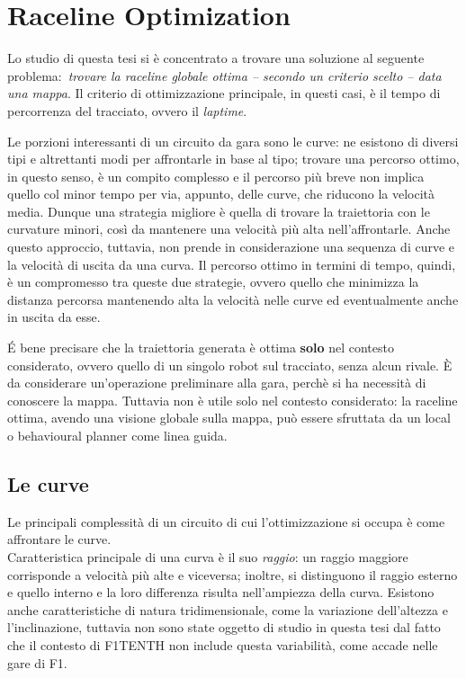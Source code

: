 
\chapter{Raceline Optimization}
\label{chap:opt}

Lo studio di questa tesi si è concentrato a trovare una soluzione al seguente problema:\ \textit{trovare
la raceline globale ottima \emph{\footnotesize -- secondo un criterio scelto --} data una mappa}. Il
criterio di ottimizzazione principale, in questi casi, è il tempo di percorrenza del tracciato, ovvero il
\textit{laptime}.

Le porzioni interessanti di un circuito da gara sono le curve: ne esistono di diversi tipi e altrettanti
modi per affrontarle in base al tipo; trovare una percorso ottimo, in questo senso, è un compito complesso e
il percorso più breve non implica quello col minor tempo per via, appunto, delle curve, che riducono la
velocità media. Dunque una strategia migliore è quella di trovare la traiettoria con le curvature minori,
così da mantenere una velocità più alta nell'affrontarle. Anche questo approccio, tuttavia, non prende in
considerazione una sequenza di curve e la velocità di uscita da una curva. Il percorso ottimo in termini
di tempo, quindi, è un compromesso tra queste due strategie, ovvero quello che minimizza la distanza
percorsa mantenendo alta la velocità nelle curve ed eventualmente anche in uscita da esse.

É bene precisare che la traiettoria generata è ottima \textbf{solo} nel contesto considerato, ovvero
quello di un singolo robot sul tracciato, senza alcun rivale. È da considerare un'operazione preliminare
alla gara, perchè si ha necessità di conoscere la mappa.
Tuttavia non è utile solo nel contesto considerato: la raceline ottima, avendo una visione globale sulla
mappa, può essere sfruttata da un local o behavioural planner come linea guida.

\section{Le curve}
Le principali complessità di un circuito di cui l'ottimizzazione si occupa è come affrontare le curve.\\
Caratteristica principale di una curva è il suo \textit{raggio}: un raggio maggiore corrisponde a
velocità più alte e viceversa; inoltre, si distinguono il raggio esterno e quello interno e la loro
differenza risulta nell'ampiezza della curva.
Esistono anche caratteristiche di natura tridimensionale, come la variazione dell'altezza e
l'inclinazione, tuttavia non sono state oggetto di studio in questa tesi dal fatto che il contesto di
F1TENTH non include questa variabilità, come accade nelle gare di F1.

